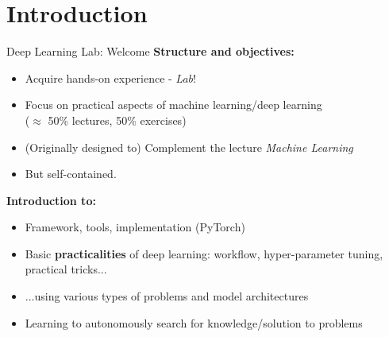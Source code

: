\section*{Introduction}
\begin{frame}{Deep Learning Lab: Welcome}
\textbf{Structure and objectives:}
  \begin{itemize}
\item Acquire hands-on experience - \textit{Lab}!
\item Focus on practical aspects of machine learning/deep learning\\
($\approx$ 50\% lectures, 50\% exercises)
\item (Originally designed to) Complement the lecture \textit{Machine Learning}
\item But self-contained.
\end{itemize}

\vspace{5mm}
\textbf{Introduction to:}
\begin{itemize}
\item Framework, tools, implementation (PyTorch)
\item Basic \textbf{practicalities} of deep learning:
workflow, hyper-parameter tuning, practical tricks...
\item ...using various types of problems and model architectures
\item Learning to autonomously search for knowledge/solution to problems
\end{itemize}

\end{frame}


